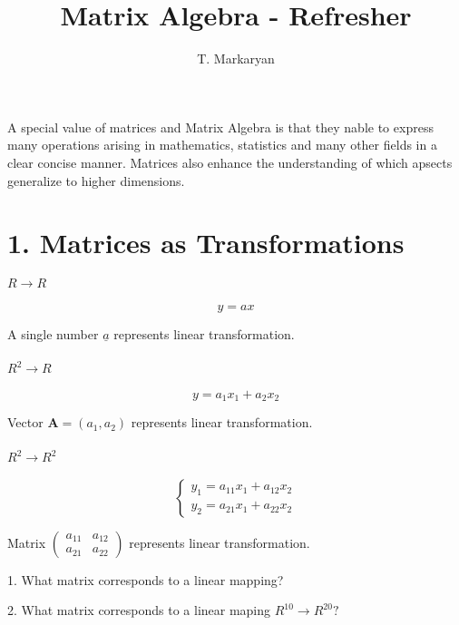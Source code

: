 \documentclass[]{article}
\title{Matrix Algebra - Refresher}
\author{T. Markaryan}
\date{}
\let\oldparagraph\paragraph
\renewcommand{\paragraph}[1]{\oldparagraph{#1}\mbox{}}
\begin{document}
\maketitle

A special value of matrices and Matrix Algebra is that they nable to
express many operations arising in mathematics, statistics and many
other fields in a clear concise manner. Matrices also enhance the
understanding of which apsects generalize to higher dimensions.

\section{1. Matrices as
Transformations}\label{matrices-as-transformations}

\paragraph{\texorpdfstring{\(R \to R\)}{R \textbackslash{}to R}}\label{r-to-r}

\[y=ax\]

A single number \(\underline{a}\) represents linear transformation.

\paragraph{\texorpdfstring{\(R^2 \to R\)}{R\^{}2 \textbackslash{}to R}}\label{r2-to-r}

\[y=a_1x_1+a_2x_2\]

Vector \(\mathbf{A}=(a_1, a_2)\) represents linear transformation.

\paragraph{\texorpdfstring{\(R^2 \to R^2\)}{R\^{}2 \textbackslash{}to R\^{}2}}\label{r2-to-r2}

\[\begin{cases} y_1 = a_{11}x_1 + a_{12}x_2\\ y_2 = a_{21}x_1 + a_{22}x_2 \end{cases}\]

Matrix
\(\begin{pmatrix} a_{11} & a_{12} \\ a_{21} & a_{22} \end{pmatrix}\)
represents linear transformation.

\begin{tcolorbox}[colback=yellow!5,colframe=yellow!40!black,title=Questions]
1. What matrix corresponds to a linear mapping?

2. What matrix corresponds to a linear maping $R^{10} \to R^{20}?$
\end{tcolorbox}
\end{document}
